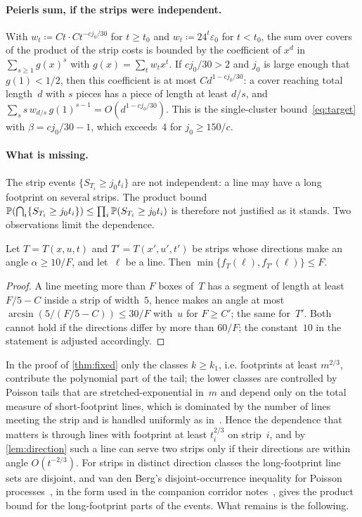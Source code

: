 \documentclass[11pt,letterpaper]{article}
\begin{document}
\paragraph{Peierls sum, if the strips were independent.} With $w_t\coloneqq Ct\cdot Ct^{-cj_0/30}$ for $t\ge t_0$ and $w_t\coloneqq24^{t}\varepsilon_0$ for $t<t_0$, the sum over covers of the product of the strip costs is bounded by the coefficient of $x^{d}$ in $\sum_{s\ge1}g(x)^s$ with $g(x)=\sum_tw_tx^t$. If $cj_0/30>2$ and $j_0$ is large enough that $g(1)<1/2$, then this coefficient is at most $Cd^{1-cj_0/30}$: a cover reaching total length~$d$ with $s$ pieces has a piece of length at least $d/s$, and $\sum_ss\,w_{d/s}\,g(1)^{s-1}=O(d^{1-cj_0/30})$. This is the single-cluster bound~\eqref{eq:target} with $\beta=cj_0/30-1$, which exceeds~$4$ for $j_0\ge150/c$.

\paragraph{What is missing.} The strip events $\{S_{T_i}\ge j_0t_i\}$ are not independent: a line may have a long footprint on several strips. The product bound $\P(\bigcap_i\{S_{T_i}\ge j_0t_i\})\le\prod_i\P(S_{T_i}\ge j_0t_i)$ is therefore not justified as it stands. Two observations limit the dependence.

\begin{lemma}
\label{lem:direction}
Let $T=T(x,u,t)$ and $T'=T(x',u',t')$ be strips whose directions make an angle $\alpha\ge10/F$, and let~$\ell$ be a line. Then $\min\{f_T(\ell),f_{T'}(\ell)\}\le F$.
\end{lemma}

\begin{proof}
A line meeting more than $F$ boxes of~$T$ has a segment of length at least $F/5-C$ inside a strip of width~$5$, hence makes an angle at most $\arcsin(5/(F/5-C))\le30/F$ with~$u$ for $F\ge C'$; the same for~$T'$. Both cannot hold if the directions differ by more than $60/F$; the constant~$10$ in the statement is adjusted accordingly.
\end{proof}

In the proof of \cref{thm:fixed} only the classes $k\ge k_1$, i.e. footprints at least $m^{2/3}$, contribute the polynomial part of the tail; the lower classes are controlled by Poisson tails that are stretched-exponential in~$m$ and depend only on the total measure of short-footprint lines, which is dominated by the number of lines meeting the strip and is handled uniformly as in~\cite[Lemma~3.2]{FM26}. Hence the dependence that matters is through lines with footprint at least $t_i^{2/3}$ on strip~$i$, and by \cref{lem:direction} such a line can serve two strips only if their directions are within angle $O(t^{-2/3})$. For strips in distinct direction classes the long-footprint line sets are disjoint, and van den Berg's disjoint-occurrence inequality for Poisson processes~\cite{vdB96}, in the form used in the companion corridor notes~\cite{ORC26}, gives the product bound for the long-footprint parts of the events. What remains is the following.
\end{document}
